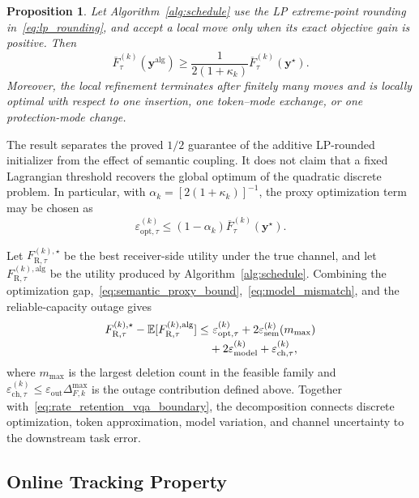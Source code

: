 \documentclass[journal]{IEEEtran}
\newtheorem{proposition}{Proposition}
\begin{document}
\begin{proposition}
Let Algorithm~\ref{alg:schedule} use the LP extreme-point rounding in~\eqref{eq:lp_rounding}, and accept a local move only when its exact objective gain is positive. Then
\begin{equation}
\overline F_{\tau}^{(k)}(\bm y^{\mathrm{alg}})
\geq\frac{1}{2(1+\kappa_k)}
\overline F_{\tau}^{(k)}(\bm y^{\star}).
\label{eq:coupled_approximation}
\end{equation}
Moreover, the local refinement terminates after finitely many moves and is locally optimal with respect to one insertion, one token--mode exchange, or one protection-mode change.
\end{proposition}

The result separates the proved $1/2$ guarantee of the additive LP-rounded initializer from the effect of semantic coupling. It does not claim that a fixed Lagrangian threshold recovers the global optimum of the quadratic discrete problem. In particular, with $\alpha_k=[2(1+\kappa_k)]^{-1}$, the proxy optimization term may be chosen as
\begin{equation}
\varepsilon_{\mathrm{opt},\tau}^{(k)}
\leq(1-\alpha_k)
\overline F_{\tau}^{(k)}(\bm y^{\star}).
\label{eq:optimization_gap}
\end{equation}

Let $F_{\mathrm R,\tau}^{(k),\star}$ be the best receiver-side utility under the true channel, and let $F_{\mathrm R,\tau}^{(k),\mathrm{alg}}$ be the utility produced by Algorithm~\ref{alg:schedule}. Combining the optimization gap,~\eqref{eq:semantic_proxy_bound},~\eqref{eq:model_mismatch}, and the reliable-capacity outage gives
\begin{align}
F_{\mathrm R,\tau}^{(k),\star}
-\mathbb E[F_{\mathrm R,\tau}^{(k),\mathrm{alg}}]
\leq&~\varepsilon_{\mathrm{opt},\tau}^{(k)}
+2\varepsilon_{\mathrm{sem}}^{(k)}(m_{\max})
\notag\\[-0.2em]
&+2\varepsilon_{\mathrm{model}}^{(k)}
+\varepsilon_{\mathrm{ch},\tau}^{(k)},
\label{eq:end_to_end_gap}
\end{align}
where $m_{\max}$ is the largest deletion count in the feasible family and $\varepsilon_{\mathrm{ch},\tau}^{(k)}\leq\varepsilon_{\mathrm{out}}\Delta_{F,k}^{\max}$ is the outage contribution defined above. Together with~\eqref{eq:rate_retention_vqa_boundary}, the decomposition connects discrete optimization, token approximation, model variation, and channel uncertainty to the downstream task error.

\subsection{Online Tracking Property}
\end{document}

